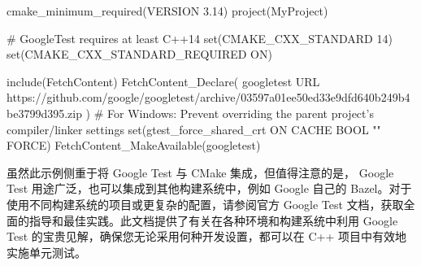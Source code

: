 \begin{cmake}
cmake_minimum_required(VERSION 3.14)
project(MyProject)

# GoogleTest requires at least C++14
set(CMAKE_CXX_STANDARD 14)
set(CMAKE_CXX_STANDARD_REQUIRED ON)

include(FetchContent)
FetchContent_Declare(
    googletest
    URL https://github.com/google/googletest/archive/03597a01ee50ed33e9dfd640b249b4be3799d395.zip
)
# For Windows: Prevent overriding the parent project's compiler/linker settings
set(gtest_force_shared_crt ON CACHE BOOL "" FORCE)
FetchContent_MakeAvailable(googletest)
\end{cmake}

虽然此示例侧重于将 Google Test 与 CMake 集成，但值得注意的是， Google Test 用途广泛，也可以集成到其他构建系统中，例如 Google 自己的 Bazel。对于使用不同构建系统的项目或更复杂的配置，请参阅官方 Google Test 文档，获取全面的指导和最佳实践。此文档提供了有关在各种环境和构建系统中利用 Google Test 的宝贵见解，确保您无论采用何种开发设置，都可以在 C++ 项目中有效地实施单元测试。



